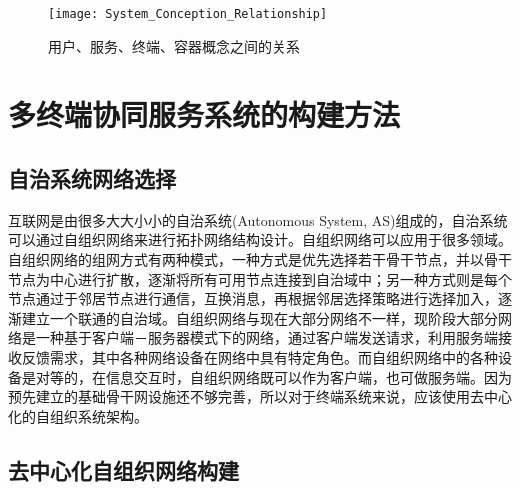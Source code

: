 \begin{figure}[!htbp]
    \centering
    \texttt{[image: System\_Conception\_Relationship]}
    \caption{用户、服务、终端、容器概念之间的关系}
    \label{fig:system_conception_relationship}
\end{figure}


\section{多终端协同服务系统的构建方法}\label{sec:service_system_decentralized_network}
\subsection{自治系统网络选择}

互联网是由很多大大小小的自治系统(Autonomous System, AS)组成的\cite{牛力人2015互联网关键自治系统的地理分布特性分析}，自治系统可以通过自组织网络来进行拓扑网络结构设计。自组织网络可以应用于很多领域\cite{寇明延2010面向任务能力的自组织网络体系结构}。自组织网络的组网方式有两种模式，一种方式是优先选择若干骨干节点，并以骨干节点为中心进行扩散，逐渐将所有可用节点连接到自治域中\cite{ryu2003multitier,khan2009hierarchical}；另一种方式则是每个节点通过于邻居节点进行通信，互换消息，再根据邻居选择策略进行选择加入，逐渐建立一个联通的自治域\cite{寇明延2010面向任务能力的自组织网络体系结构}。自组织网络与现在大部分网络不一样，现阶段大部分网络是一种基于客户端－服务器模式下的网络，通过客户端发送请求，利用服务端接收反馈需求，其中各种网络设备在网络中具有特定角色。而自组织网络中的各种设备是对等的，在信息交互时，自组织网络既可以作为客户端，也可做服务端。因为预先建立的基础骨干网设施还不够完善，所以对于终端系统来说，应该使用去中心化的自组织系统架构。

\subsection{去中心化自组织网络构建}

